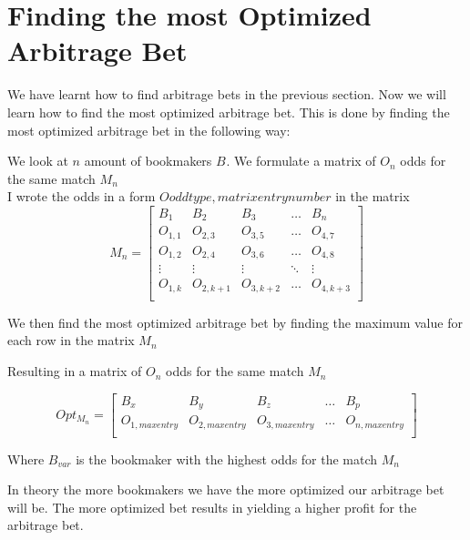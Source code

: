 
\section{Finding the most Optimized Arbitrage Bet}

We have learnt how to find arbitrage bets in the previous section. Now we will learn how to find the most optimized arbitrage bet. This is done by finding the most optimized arbitrage bet in the following way:

We look at $n$ amount of bookmakers $B_{}$. We formulate a matrix of $O_{n}$ odds for the same match $M_{n}$\\

I wrote the odds in a form $O{oddtype,matrixentrynumber}$ in the matrix\\

\begin{equation}
    M_{n} = \begin{bmatrix}
        B_{1} & B_{2} & B_{3} & \dots & B_{n} \\
        O_{1,1} & O_{2,3} & O_{3,5} & \dots & O_{4,7} \\
        O_{1,2} & O_{2,4} & O_{3,6} & \dots & O_{4,8} \\
        \vdots & \vdots & \vdots & \ddots & \vdots \\
        O_{1,k} & O_{2,k+1} & O_{3,k+2} & \dots & O_{4,k+3} \\
    \end{bmatrix}
\end{equation}

We then find the most optimized arbitrage bet by finding the maximum value for each row in the matrix $M_{n}$

Resulting in a matrix of $O_{n}$ odds for the same match $M_{n}$

\begin{equation}
    Opt_{M_{n}} = \begin{bmatrix}
        B_{x} & B_{y} & B_{z} & \dots & B_{p} \\
        O_{1,maxentry} & O_{2,maxentry} & O_{3,maxentry} & \dots & O_{n,maxentry} \\
    \end{bmatrix}
\end{equation}

Where $B_{var}$ is the bookmaker with the highest odds for the match $M_{n}$

In theory the more bookmakers we have the more optimized our arbitrage bet will be. The more optimized bet results in yielding a higher profit for the arbitrage bet.\\

